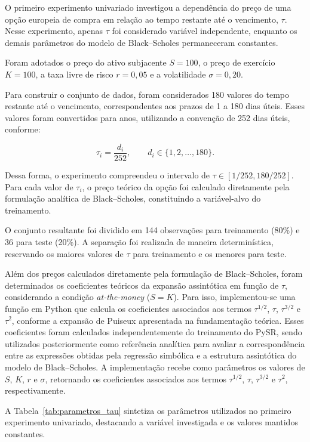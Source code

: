 O primeiro experimento univariado investigou a
dependência do preço de uma opção europeia de compra
em relação ao tempo restante até o vencimento,
$\tau$. Nesse experimento, apenas $\tau$ foi
considerado variável independente, enquanto os
demais parâmetros do modelo de Black--Scholes
permaneceram constantes.

Foram adotados o preço do ativo subjacente
$S=100$, o preço de exercício $K=100$,
a taxa livre de risco $r=0{,}05$ e a
volatilidade $\sigma=0{,}20$.

Para construir o conjunto de dados, foram
considerados 180 valores do tempo restante
até o vencimento, correspondentes aos prazos
de 1 a 180 dias úteis. Esses valores foram
convertidos para anos, utilizando a convenção
de 252 dias úteis, conforme:

\begin{equation}
    \tau_i = \frac{d_i}{252},
    \qquad d_i \in \{1,2,\ldots,180\}.
\end{equation}

Dessa forma, o experimento compreendeu o
intervalo de $\tau \in [1/252,180/252]$.
Para cada valor de $\tau_i$, o preço
teórico da opção foi calculado diretamente
pela formulação analítica de Black--Scholes,
constituindo a variável-alvo do treinamento.

O conjunto resultante foi dividido em
144 observações para treinamento (80\%)
e 36 para teste (20\%). A separação foi
realizada de maneira determinística,
reservando os maiores valores de $\tau$
para treinamento e os menores para teste.

Além dos preços calculados diretamente pela
formulação de Black--Scholes, foram determinados
os coeficientes teóricos da expansão assintótica
em função de $\tau$, considerando a condição \textit{at-the-money} ($S=K$). Para isso, implementou-se uma função em Python
que calcula os coeficientes associados aos
termos $\tau^{1/2}$, $\tau$, $\tau^{3/2}$
e $\tau^2$, conforme a expansão de Puiseux
apresentada na fundamentação teórica. Esses coeficientes foram calculados
independentemente do treinamento do PySR,
sendo utilizados posteriormente como
referência analítica para avaliar a
correspondência entre as expressões obtidas
pela regressão simbólica e a estrutura
assintótica do modelo de Black--Scholes.
A implementação recebe como parâmetros os valores
de $S$, $K$, $r$ e $\sigma$, retornando os
coeficientes associados aos termos
$\tau^{1/2}$, $\tau$, $\tau^{3/2}$ e $\tau^2$,
respectivamente.

A Tabela~\ref{tab:parametros_tau} sintetiza os parâmetros
utilizados no primeiro experimento univariado,
destacando a variável investigada e os valores
mantidos constantes.


